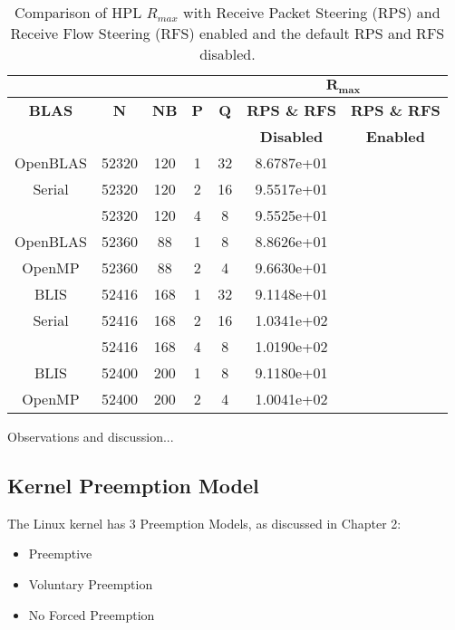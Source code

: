 \begin{table}[H]
\begin{center}
\begin{tabular}{ |c|c|c|c|c|c|c| } 
\hline
\multicolumn{5}{|c}{} & \multicolumn{2}{|c|}{$\mathbf{R_{max}}$} \\
\hline
\textbf{BLAS} & \textbf{N} & \textbf{NB} & \textbf{P} & \textbf{Q} & \textbf{RPS \& RFS} & \textbf{RPS \& RFS} \\
              &            &             &            &            & \textbf{Disabled}   & \textbf{Enabled} \\
\hline
OpenBLAS & 52320 & 120 & 1 & 32 & 8.6787e+01 & \\
Serial   & 52320 & 120 & 2 & 16 & 9.5517e+01 & \\
         & 52320 & 120 & 4 &  8 & 9.5525e+01 & \\
\hline
OpenBLAS & 52360 &  88 & 1 &  8 & 8.8626e+01 & \\
OpenMP   & 52360 &  88 & 2 &  4 & 9.6630e+01 & \\
\hline
BLIS     & 52416 & 168 & 1 & 32 & 9.1148e+01 & \\
Serial   & 52416 & 168 & 2 & 16 & 1.0341e+02 & \\
         & 52416 & 168 & 4 &  8 & 1.0190e+02 & \\
\hline
BLIS     & 52400 & 200 & 1 &  8 & 9.1180e+01 & \\
OpenMP   & 52400 & 200 & 2 &  4 & 1.0041e+02 & \\
\hline
\end{tabular}
\end{center}
\caption{\label{tab:table-name}Comparison of HPL $R_{max}$ with Receive Packet Steering (RPS) and Receive Flow Steering (RFS) enabled and the default RPS and RFS disabled.}
\end{table}

Observations and discussion...



%
%
\subsection{Kernel Preemption Model}

The Linux kernel has 3 Preemption Models, as discussed in Chapter 2:

\begin{itemize}
\item Preemptive
\item Voluntary Preemption
\item No Forced Preemption
\end{itemize}

